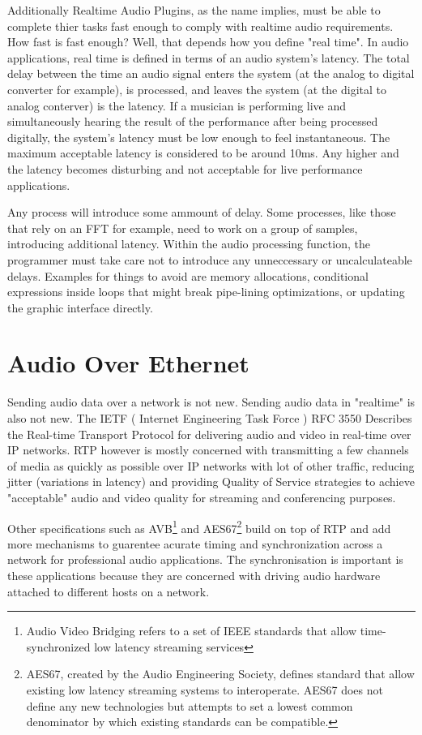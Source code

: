 Additionally Realtime Audio Plugins, as the name implies, must be able to complete thier tasks fast enough to comply with realtime audio requirements. How fast is fast enough? Well, that depends how you define "real time". In audio applications, real time is defined in terms of an audio system's latency. The total delay between the time an audio signal enters the system (at the analog to digital converter for example), is processed, and leaves the system (at the digital to analog conterver) is the latency. If a musician is performing live and simultaneously hearing the result of the performance after being processed digitally, the system's latency must be low enough to feel instantaneous. The maximum acceptable latency is considered to be around 10ms\cite{AES67-2013}. Any higher and the latency becomes disturbing and not acceptable for live performance applications.

Any process will introduce some ammount of delay. Some processes, like those that rely on an FFT for example, need to work on a group of samples, introducing additional latency. Within the audio processing function, the programmer must take care not to introduce any unneccessary or uncalculateable delays. Examples for things to avoid are memory allocations, conditional expressions inside loops that might break pipe-lining optimizations\cite{realtime-architectures}, or updating the graphic interface directly.

\section{Audio Over Ethernet}

Sending audio data over a network is not new. Sending audio data in "realtime" is also not new. The IETF ( Internet Engineering Task Force ) RFC 3550 Describes the Real-time Transport Protocol for delivering audio and video in real-time over IP networks. RTP however is mostly concerned with transmitting a few channels of media as quickly as possible over IP networks with lot of other traffic, reducing jitter (variations in latency) and providing Quality of Service strategies to achieve "acceptable" audio and video quality for streaming and conferencing purposes.

Other specifications such as AVB\footnote{Audio Video Bridging refers to a set of IEEE standards that allow time-synchronized low latency streaming services } and AES67\footnote{AES67, created by the Audio Engineering Society, defines standard that allow existing low latency streaming systems to interoperate. AES67 does not define any new technologies but attempts to set a lowest common denominator by which existing standards can be compatible. } build on top of RTP and add more mechanisms to guarentee acurate timing and synchronization across a network for professional audio applications. The synchronisation is important is these applications because they are concerned with driving audio hardware attached to different hosts on a network.

